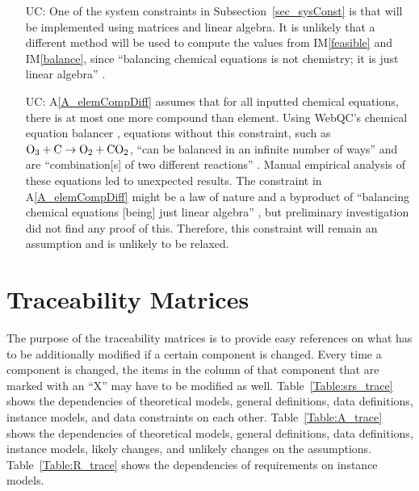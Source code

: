 \documentclass[12pt]{article}
\newcommand{\aref}[1]{A\ref{#1}}
\newcommand{\iref}[1]{IM\ref{#1}}
\newcounter{ucnum} %
\begin{document}
\begin{itemize}

  \item[UC\refstepcounter{ucnum}\theucnum\label{UC_diffSolveMethod}:] One of
    the system constraints in Subsection~\ref{sec_sysConst} is that \progname{}
    will be implemented using matrices and linear algebra. It is unlikely that
    a different method will be used to compute the values from \iref{feasible}
    and \iref{balance}, since ``balancing chemical equations is not chemistry;
    it is just linear algebra'' \cite[p. 193]{risteski_new_2021}.

  \item[UC\refstepcounter{ucnum}\theucnum\label{UC_allEqsPermitted}:]
    \aref{A_elemCompDiff} assumes that for all inputted chemical equations,
    there is at most one more compound than element. Using WebQC's chemical
    equation balancer \cite{noauthor_balance_2023}, equations without this
    constraint, such as $\ce{O3} + \ce{C} \rightarrow \ce{O2} + \ce{CO2}$,
    ``can be balanced in an infinite number of ways'' and are
    ``combination[s] of two different reactions'' \cite{noauthor_balance_2023}.
    Manual empirical analysis of these equations led to unexpected results.
    The constraint in \aref{A_elemCompDiff} might be a law of nature and a
    byproduct of ``balancing chemical equations [being] just linear algebra''
    \cite[p. 193]{risteski_new_2021}, but preliminary investigation did not
    find any proof of this. Therefore, this constraint will remain an
    assumption and is unlikely to be relaxed.

\end{itemize}

\section{Traceability Matrices} \label{sec_traceMats}

The purpose of the traceability matrices is to provide easy references on what
has to be additionally modified if a certain component is changed.  Every time a
component is changed, the items in the column of that component that are marked
with an ``X'' may have to be modified as well. Table~\ref{Table:srs_trace} shows
the dependencies of theoretical models, general definitions, data definitions,
instance models, and data constraints on each other. Table~\ref{Table:A_trace}
shows the dependencies of theoretical models,
general definitions, data definitions, instance models, likely changes, and
unlikely changes on the assumptions. Table~\ref{Table:R_trace}
shows the dependencies of requirements on instance models.
\end{document}
